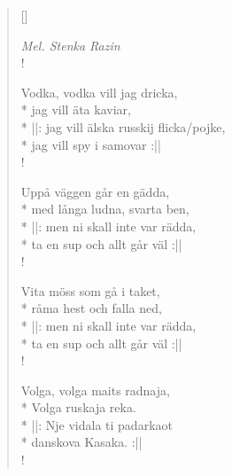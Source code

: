 
\settowidth{\versewidth}{Nej, för fan bara blunda och svälj}



\begin{verse}[\versewidth]

\flagverse{}
\emph{Mel. Stenka Razin}\\!

Vodka, vodka vill jag dricka,\\*
jag vill äta kaviar,\\*
||: jag vill älska russkij flicka/pojke,\\*
jag vill spy i samovar :||\\!


Uppå väggen går en gädda,\\*
med långa ludna, svarta ben,\\*
||: men ni skall inte var rädda,\\*
ta en sup och allt går väl :||\\!


Vita möss som gå i taket,\\*
råma hest och falla ned,\\*
||: men ni skall inte var rädda,\\*
ta en sup och allt går väl :||\\!


Volga, volga maits radnaja,\\*
Volga ruskaja reka.\\*
||: Nje vidala ti padarkaot\\*
danskova Kasaka. :||\\!


\end{verse}

